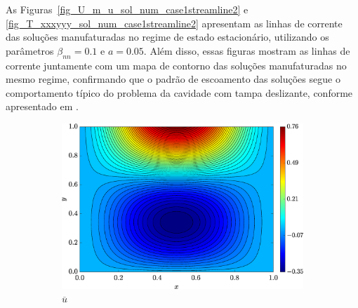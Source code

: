 As Figuras~\ref{fig_U_m_u_sol_num_case1streamline2} e \ref{fig_T_xxxyyy_sol_num_case1streamline2} apresentam as linhas de corrente das soluções manufaturadas no regime de estado estacionário, utilizando os parâmetros $\beta_{nn} = 0.1$ e $a = 0.05$. Além disso, essas figuras mostram as linhas de corrente juntamente com um mapa de contorno das soluções manufaturadas no mesmo regime, confirmando que o padrão de escoamento das soluções segue o comportamento típico do problema da cavidade com tampa deslizante, conforme apresentado em .
\begin{figure}[H]
        \centering
        \caption{Mapas de cores das soluções manufaturadas no regime de estado estacionário para o campo de velocidades $(\overline{u},\tilde{v})$, vorticidade $(\tilde{\omega_{z}})$ e função de corrente $(\tilde{\psi})$, considerando $a = 0.05$ em $t=0.1$}
        \label{fig_U_m_u_sol_num_case1streamline2}
        \begin{subfigure}[b]{.47\textwidth}
            \includegraphics[width=\textwidth]{figures/Case12/UCM/Solutions/Exact_Map_NormErr_2nd_Betann_0.1_Re_1_Wi_1_epsilon_0_xi_0_alphaG_0_Dt_1e-06_at_0.05_tipsim_1_MMS_12_U.eps}
            \caption{$\overline{u}$}
            \label{fig_solexaustreamlineCase1}
        \end{subfigure}
        \vspace{0.2cm}
        \begin{subfigure}[b]{.47\textwidth}

\end{subfigure}
\end{figure}
